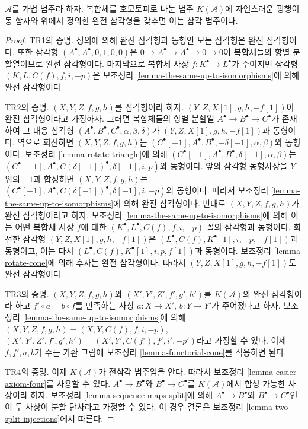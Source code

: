 \begin{proposition}
\label{proposition-homotopy-category-triangulated}
$\mathcal{A}$를 가법 범주라 하자. 복합체를 호모토피로 나눈 범주
$K(\mathcal{A})$에 자연스러운 평행이동 함자와 위에서 정의한 완전
삼각형을 갖추면 이는 삼각 범주이다.
\end{proposition}

\begin{proof}
TR1의 증명. 정의에 의해 완전 삼각형과 동형인 모든 삼각형은
완전 삼각형이다. 또한 삼각형 $(A^\bullet, A^\bullet, 0, 1, 0, 0)$은
$0 \to A^\bullet \to A^\bullet \to 0 \to 0$이 복합체들의 항별
분할열이므로 완전 삼각형이다. 마지막으로 복합체 사상
$f : K^\bullet \to L^\bullet$가 주어지면 삼각형
$(K, L, C(f), f, i, -p)$은 보조정리
\ref{lemma-the-same-up-to-isomorphisms}에 의해 완전 삼각형이다.

\medskip\noindent
TR2의 증명. $(X, Y, Z, f, g, h)$를 삼각형이라 하자.
$(Y, Z, X[1], g, h, -f[1])$이 완전 삼각형이라고 가정하자.
그러면 복합체들의 항별 분할열 $A^\bullet \to B^\bullet \to C^\bullet$가
존재하여 그 대응 삼각형
$(A^\bullet, B^\bullet, C^\bullet, \alpha, \beta, \delta)$가
$(Y, Z, X[1], g, h, -f[1])$과 동형이다. 역으로 회전하면
$(X, Y, Z, f, g, h)$는
$(C^\bullet[-1], A^\bullet, B^\bullet, -\delta[-1], \alpha, \beta)$와
동형이다. 보조정리 \ref{lemma-rotate-triangle}에 의해
$(C^\bullet[-1], A^\bullet, B^\bullet, \delta[-1], \alpha, \beta)$는
$(C^\bullet[-1], A^\bullet, C(\delta[-1])^\bullet,
\delta[-1], i, p)$와 동형이다. 앞의 삼각형 동형사상을 $Y$ 위의
$-1$과 합성하면 $(X, Y, Z, f, g, h)$는
$(C^\bullet[-1], A^\bullet, C(\delta[-1])^\bullet,
\delta[-1], i, -p)$와 동형이다. 따라서 보조정리
\ref{lemma-the-same-up-to-isomorphisms}에 의해 완전 삼각형이다.
반대로 $(X, Y, Z, f, g, h)$가 완전 삼각형이라고 하자. 보조정리
\ref{lemma-the-same-up-to-isomorphisms}에 의해 이는 어떤 복합체 사상
$f$에 대한 $(K^\bullet, L^\bullet, C(f), f, i, -p)$ 꼴의 삼각형과
동형이다. 회전한 삼각형 $(Y, Z, X[1], g, h, -f[1])$은
$(L^\bullet, C(f), K^\bullet[1], i, -p, -f[1])$과 동형이고,
이는 다시 $(L^\bullet, C(f), K^\bullet[1], i, p, f[1])$과 동형이다.
보조정리 \ref{lemma-rotate-cone}에 의해 후자는 완전 삼각형이다.
따라서 $(Y, Z, X[1], g, h, -f[1])$도 완전 삼각형이다.

\medskip\noindent
TR3의 증명. $(X, Y, Z, f, g, h)$와
$(X', Y', Z', f', g', h')$를 $K(\mathcal{A})$의 완전 삼각형이라
하고 $f' \circ a = b \circ f$를 만족하는 사상
$a : X \to X'$, $b : Y \to Y'$가 주어졌다고 하자. 보조정리
\ref{lemma-the-same-up-to-isomorphisms}에 의해
$(X, Y, Z, f, g, h) = (X, Y, C(f), f, i, -p)$,
$(X', Y', Z', f', g', h') = (X', Y', C(f'), f', i', -p')$라고
가정할 수 있다. 이제 $f, f', a, b$가 주는 가환 그림에
보조정리 \ref{lemma-functorial-cone}를 적용하면 된다.

\medskip\noindent
TR4의 증명. 이제 $K(\mathcal{A})$가 전삼각 범주임을 안다. 따라서
보조정리 \ref{lemma-easier-axiom-four}를 사용할 수 있다.
$A^\bullet \to B^\bullet$와 $B^\bullet \to C^\bullet$를
$K(\mathcal{A})$에서 합성 가능한 사상이라 하자. 보조정리
\ref{lemma-sequence-maps-split}에 의해 $A^\bullet \to B^\bullet$와
$B^\bullet \to C^\bullet$인 이 두 사상이 분할 단사라고
가정할 수 있다. 이 경우 결론은 보조정리
\ref{lemma-two-split-injections}에서 따른다.
\end{proof}

